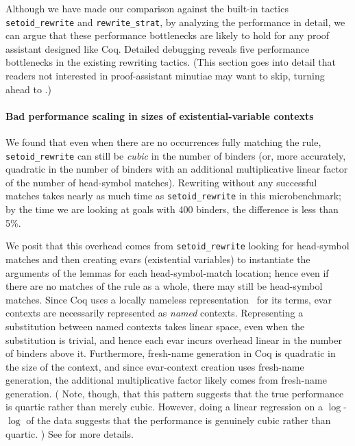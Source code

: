 Although we have made our comparison against the built-in tactics \texttt{setoid_rewrite} and \texttt{rewrite_strat}, by analyzing the performance in detail, we can argue that these performance bottlenecks are likely to hold for any proof assistant designed like Coq.
Detailed debugging reveals five performance bottlenecks in the existing rewriting tactics.
(This section goes into detail that readers not interested in proof-assistant minutiae may want to skip, turning ahead to  .)

\paragraph{Bad performance scaling in sizes of existential-variable contexts}

We found that even when there are no occurrences fully matching the rule, \texttt{setoid_rewrite} can still be \emph{cubic} in the number of binders (or, more accurately, quadratic in the number of binders with an additional multiplicative linear factor of the number of head-symbol matches).
Rewriting without any successful matches takes nearly as much time as \texttt{setoid_rewrite} in this microbenchmark; by the time we are looking at goals with 400 binders, the difference is less than 5\%.

We posit that this overhead comes from \texttt{setoid_rewrite} looking for head-symbol matches and then creating evars (existential variables) to instantiate the arguments of the lemmas for each head-symbol-match location; hence even if there are no matches of the rule as a whole, there may still be head-symbol matches.
Since Coq uses a locally nameless representation~\cite{Engineering2008Aydemir} for its terms, evar contexts are necessarily represented as \emph{named} contexts.
Representing a substitution between named contexts takes linear space, even when the substitution is trivial, and hence each evar incurs overhead linear in the number of binders above it.
Furthermore, fresh-name generation in Coq is quadratic in the size of the context, and since evar-context creation uses fresh-name generation, the additional multiplicative factor likely comes from fresh-name generation.
(%
Note, though, that this pattern suggests that the true performance is quartic rather than merely cubic.
However, doing a linear regression on a $\log$-$\log$ of the data suggests that the performance is genuinely cubic rather than quartic.%
)
See  for more details.

